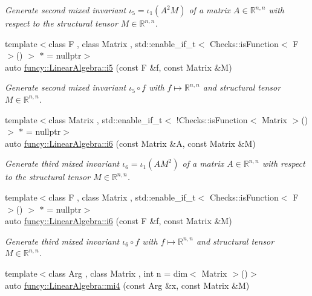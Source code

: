 \begin{DoxyCompactItemize}
\begin{DoxyCompactList}\small\item\em Generate second mixed invariant $ \iota_5=\iota_1(A^2M) $ of a matrix $A\in\mathbb{R}^{n,n}$ with respect to the structural tensor $M\in\mathbb{R}^{n,n}$. \end{DoxyCompactList}\item 
{\footnotesize template$<$class F , class Matrix , std\-::enable\-\_\-if\-\_\-t$<$ Checks\-::is\-Function$<$ F $>$() $>$ $\ast$  = nullptr$>$ }\\auto \hyperlink{group__InvariantGroup_ga5dcdde79eb75b3f69652f939ea8ef029}{funcy\-::\-Linear\-Algebra\-::i5} (const F \&f, const Matrix \&M)
\begin{DoxyCompactList}\small\item\em Generate second mixed invariant $ \iota_5\circ f $ with $f\mapsto\mathbb{R}^{n,n}$ and structural tensor $M\in\mathbb{R}^{n,n}$. \end{DoxyCompactList}\item 
{\footnotesize template$<$class Matrix , std\-::enable\-\_\-if\-\_\-t$<$ !\-Checks\-::is\-Function$<$ Matrix $>$() $>$ $\ast$  = nullptr$>$ }\\auto \hyperlink{group__InvariantGroup_gaa0c4c64776bb36124d6b5af013ff14b1}{funcy\-::\-Linear\-Algebra\-::i6} (const Matrix \&A, const Matrix \&M)
\begin{DoxyCompactList}\small\item\em Generate third mixed invariant $ \iota_6=\iota_1(AM^2) $ of a matrix $A\in\mathbb{R}^{n,n}$ with respect to the structural tensor $M\in\mathbb{R}^{n,n}$. \end{DoxyCompactList}\item 
{\footnotesize template$<$class F , class Matrix , std\-::enable\-\_\-if\-\_\-t$<$ Checks\-::is\-Function$<$ F $>$() $>$ $\ast$  = nullptr$>$ }\\auto \hyperlink{group__InvariantGroup_ga102395488a9c5a67af658d35dd45ee11}{funcy\-::\-Linear\-Algebra\-::i6} (const F \&f, const Matrix \&M)
\begin{DoxyCompactList}\small\item\em Generate third mixed invariant $ \iota_6\circ f $ with $f\mapsto\mathbb{R}^{n,n}$ and structural tensor $M\in\mathbb{R}^{n,n}$. \end{DoxyCompactList}\item 
{\footnotesize template$<$class Arg , class Matrix , int n = dim$<$ Matrix $>$()$>$ }\\auto \hyperlink{group__InvariantGroup_ga8a80d59d53e7ad96a7dd7fdea9ed4983}{funcy\-::\-Linear\-Algebra\-::mi4} (const Arg \&x, const Matrix \&M)

\end{DoxyCompactItemize}
